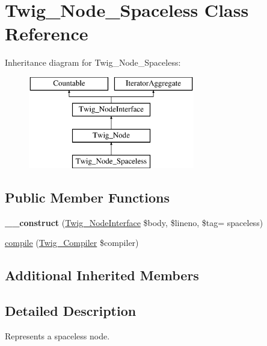 \hypertarget{class_twig___node___spaceless}{}\section{Twig\+\_\+\+Node\+\_\+\+Spaceless Class Reference}
\label{class_twig___node___spaceless}
Inheritance diagram for Twig\+\_\+\+Node\+\_\+\+Spaceless\+:\begin{figure}[H]
\begin{center}
\leavevmode
\includegraphics[height=4.000000cm]{class_twig___node___spaceless}
\end{center}
\end{figure}
\subsection*{Public Member Functions}
\begin{DoxyCompactItemize}
\item 
\hypertarget{class_twig___node___spaceless_abccde94ca072da2e20cfecfba1bf8f1e}{}{\bfseries \+\_\+\+\_\+construct} (\hyperlink{interface_twig___node_interface}{Twig\+\_\+\+Node\+Interface} \$body, \$lineno, \$tag= \textquotesingle{}spaceless\textquotesingle{})\label{class_twig___node___spaceless_abccde94ca072da2e20cfecfba1bf8f1e}

\item 
\hyperlink{class_twig___node___spaceless_a4e0faa87c3fae583620b84d3607085da}{compile} (\hyperlink{class_twig___compiler}{Twig\+\_\+\+Compiler} \$compiler)
\end{DoxyCompactItemize}
\subsection*{Additional Inherited Members}


\subsection{Detailed Description}
Represents a spaceless node.

